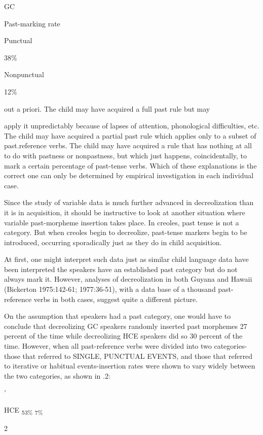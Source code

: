 GC

Past-marking rate

Punctual

38\%

Nonpunctual

12\%

out a priori. The child may have acquired a full past rule but may

apply it unpredictably because of lapses of attention, phonological difficulties, etc. The child may have acquired a partial past rule which applies only to a subset of past.reference verbs. The child may have acquired a rule that has nothing at all to do with pastness or non\-pastness, but which just happens, coincidentally, to mark a certain percentage of past-tense verbs. Which of these explanations is the correct one can only be determined by empirical investigation in each individual case.

Since the study of variable data is much further advanced in decreolization than it is in acquisition, it should be instructive to look at another situation where variable past-morpheme insertion takes place. In creoles, past tense is not a category. But when creoles begin to decreolize, past-tense markers begin to be introduced, occurring sporadically just as they do in child acquisition.

At first, one might interpret such data just as similar child language data have been interpreted the speakers have an established past category but do not always mark it. However, analyses of de\-creolization in both Guyana and Hawaii (Bickerton 1975:142-61; 1977:36-51), with a data base of a thousand past-reference verbs in both cases, suggest quite a different picture.

On the assumption that speakers had a past category, one would have to conclude that decreolizing GC speakers randomly inserted past morphemes 27 percent of the time while decreolizing HCE speak\-ers did so 30 percent of the time. However, when all past-reference verbs were divided into two categories-those that referred to SINGLE, PUNCTUAL EVENTS, and those that referred to iterative or habitual events-insertion rates were shown to vary widely between the two categories, as shown in .2:

'

HCE \textsubscript{53\% }\textsubscript{7\%}

\begin{table}
\caption{2}
\label{tab:3}
\end{table}

